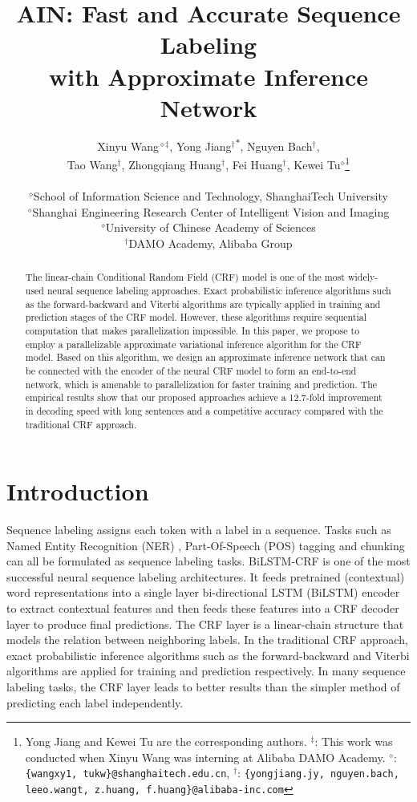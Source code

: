 \documentclass[11pt,a4paper]{article}
\title{AIN: Fast and Accurate Sequence Labeling \\with Approximate Inference Network}
\author{\parbox{\linewidth}{\centering Xinyu Wang$^{\diamond\ddagger}$, Yong Jiang$^{\dagger}$\textsuperscript{$\ast$}, Nguyen Bach$^{\dagger}$, \\ Tao Wang$^{\dagger}$, Zhongqiang Huang$^{\dagger}$, Fei Huang$^{\dagger}$,  Kewei Tu$^{\diamond}$\thanks{\hspace{1mm} Yong Jiang and Kewei Tu are the corresponding authors. $^{\ddagger}$: This work was conducted when Xinyu Wang was interning at Alibaba DAMO Academy. $^{\diamond}$: {\tt \{wangxy1, tukw\}@shanghaitech.edu.cn}, $^{\dagger}$: {\tt \{yongjiang.jy, nguyen.bach, leeo.wangt, z.huang, f.huang\}@alibaba-inc.com}}} \\
 $^\diamond$School of Information Science and Technology, ShanghaiTech University \\
 $^{\diamond}$Shanghai Engineering Research Center of Intelligent Vision and Imaging \\
$^{\diamond}$University of Chinese Academy of Sciences \\
 $^\dagger$DAMO Academy, Alibaba Group \\
}
\date{}
\begin{document}
\maketitle

\begin{abstract}
The linear-chain Conditional Random Field (CRF) model is one of the most widely-used neural sequence labeling approaches. Exact probabilistic inference algorithms such as the forward-backward and Viterbi algorithms are typically applied in training and prediction stages of the CRF model. However, these algorithms require sequential computation that makes parallelization impossible. In this paper, we propose to employ a parallelizable approximate variational inference algorithm for the CRF model. Based on this algorithm, we design an approximate inference network that can be connected with the encoder of the neural CRF model to form an end-to-end network, which is amenable to parallelization for faster training and prediction. The empirical results show that our proposed approaches achieve a 12.7-fold improvement in decoding speed with long sentences and a competitive accuracy compared with the traditional CRF approach.

\end{abstract}

\section{Introduction}
Sequence labeling assigns each token with a label in a sequence. Tasks such as Named Entity Recognition (NER) \cite{Sundheim1995NamedET}, Part-Of-Speech (POS) tagging \cite{derose-1988-grammatical} and chunking \cite{tjong-kim-sang-buchholz-2000-introduction} can all be formulated as sequence labeling tasks. BiLSTM-CRF \cite{huang2015bidirectional,lample-etal-2016-neural,ma-hovy-2016-end} is one of the most successful neural sequence labeling architectures. It feeds pretrained (contextual) word representations into a single layer bi-directional LSTM (BiLSTM) encoder to extract contextual features and then feeds these features into a CRF \cite{10.5555/645530.655813} decoder layer to produce final predictions. The CRF layer is a linear-chain structure that models the relation between neighboring labels. In the traditional CRF approach, exact probabilistic inference algorithms such as the forward-backward and Viterbi algorithms are applied for training and prediction respectively. 
In many sequence labeling tasks, the CRF layer leads to better results than the simpler method of predicting each label independently.
\end{document}
